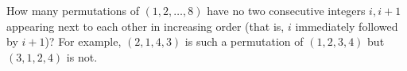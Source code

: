 How many permutations of $(1,2,\dots,8)$ have no two consecutive integers $i,i+1$ appearing next to each other in increasing order (that is, $i$ immediately followed by $i+1$)? For example, $(2,1,4,3)$ is such a permutation of $(1,2,3,4)$ but $(3,1,2,4)$ is not.
